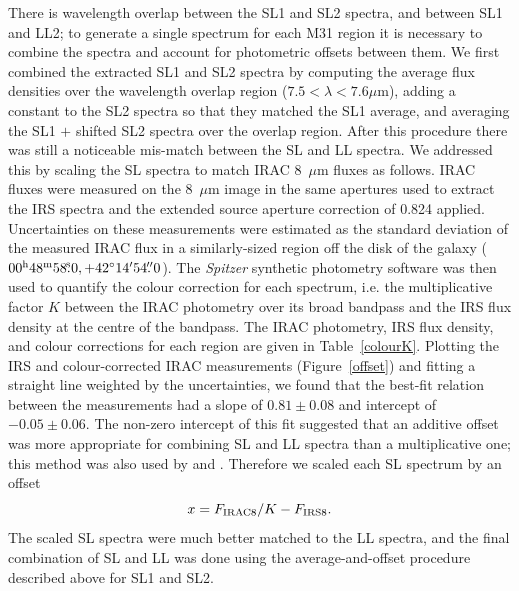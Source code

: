 There is wavelength overlap between the SL1 and SL2 spectra, and between SL1 and LL2;
to generate a single spectrum for each M31 region it is necessary to combine the spectra and
account for photometric offsets between them. We first combined the extracted SL1 and SL2 
spectra by computing the average flux densities over the wavelength overlap region ($7.5 < \lambda< 7.6\mu$m),
adding a constant  to the SL2 spectra so that they matched the SL1 average,
and averaging the SL1 $+$ shifted SL2 spectra over the overlap region.
After this procedure there was still a noticeable mis-match between the SL and LL spectra. We addressed this
by scaling the SL spectra to match IRAC 8~$\mu$m fluxes as follows. IRAC fluxes were measured
on the 8~$\mu$m image \citep{Barmby2006lr} in the same apertures used to extract the IRS spectra
and the extended source  aperture correction of 0.824 applied.
Uncertainties on these measurements were estimated as the standard deviation of the measured
IRAC flux in a similarly-sized region off the disk of the galaxy ($00^{\rmn{h}}48^{\rmn{m}}58\fs0, +42\degr14\arcmin54\farcs0$). 
The {\em Spitzer} synthetic photometry software \citep{SpitzerDAC} 
was then used to quantify the colour correction for each spectrum, i.e. the
multiplicative factor $K$ between the IRAC photometry over its broad bandpass and the IRS flux
density at the centre of the bandpass. The IRAC photometry, IRS flux density, and colour corrections 
for each region are given in Table~\ref{colourK}. Plotting the IRS  and colour-corrected IRAC measurements
(Figure~\ref{offset}) and fitting a straight line weighted by the uncertainties, we found that the best-fit relation 
between the measurements had a slope of $0.81\pm0.08$  and intercept of $-0.05\pm0.06$. 
The non-zero intercept of this fit suggested that an additive offset was more appropriate for combining SL and LL
spectra than a multiplicative one; this method was also used by \citet{Gordon:2008lr} and \citet{Engelbracht_2008}.
Therefore we scaled each SL spectrum by an offset 
\begin{equation}
x = F_{\rm IRAC8}/K -   F_{\rm IRS8}.
\label{eq:offset}
\end{equation}
The scaled SL spectra were much better matched to the LL spectra, and the final combination
of SL and LL was done using the average-and-offset procedure described above for SL1 and SL2.


